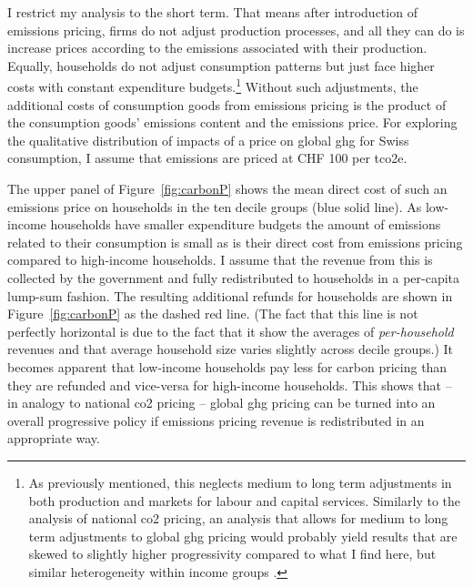 \documentclass[a4paper,11pt,abstract=true]{scrartcl}
\begin{document}
I restrict my analysis to the short term.
That means after introduction of emissions pricing, firms do not adjust production processes, and all they can do is increase prices according to the emissions associated with their production.
Equally, households do not adjust consumption patterns but just face higher costs with constant expenditure budgets.\footnote{%
  As previously mentioned, this neglects medium to long term adjustments in both production and markets for labour and capital services.
  Similarly to the analysis of national \ac{co2} pricing, an analysis that allows for medium to long term adjustments to global \ac{ghg} pricing would probably yield results that are skewed to slightly higher progressivity compared to what I find here, but similar heterogeneity within income groups \citep[compare to findings by][]{rausch_distributional_2011, landis_cost_2019}.
}
Without such adjustments, the additional costs of consumption goods from emissions pricing is the product of the consumption goods' emissions content and the emissions price.
For exploring the qualitative distribution of impacts of a price on global \ac{ghg} for Swiss consumption, I assume that emissions are priced at CHF 100 per t\ac{co2e}.

The upper panel of Figure~\ref{fig:carbonP} shows the mean direct cost of such an emissions price on households in the ten decile groups (blue solid line).
As low-income households have smaller expenditure budgets the amount of emissions related to their consumption is small as is their direct cost from emissions pricing compared to high-income households.
I assume that the revenue from this is collected by the government and fully redistributed to households in a per-capita lump-sum fashion.
The resulting additional refunds for households are shown in Figure~\ref{fig:carbonP} as the dashed red line.
(The fact that this line is not perfectly horizontal is due to the fact that it show the averages of \emph{per-household} revenues and that average household size varies slightly across decile groups.)
It becomes apparent that low-income households pay less for carbon pricing than they are refunded and vice-versa for high-income households.
This shows that -- in analogy to national \ac{co2} pricing -- global \ac{ghg} pricing can be turned into an overall progressive policy if emissions pricing revenue is redistributed in an appropriate way.
\end{document}
